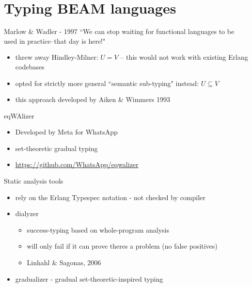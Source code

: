 \documentclass[
  ignorenonframetext,
  aspectratio=169]{beamer}
\providecommand{\tightlist}{%
  \setlength{\itemsep}{0pt}\setlength{\parskip}{0pt}}
\begin{document}
\section{Typing BEAM languages}\label{typing-beam-languages}

\begin{frame}{Marlow \& Wadler - 1997}
\label{marlow-wadler---1997}
\centering
``We can stop waiting for functional languages to be used in practice--that day is here!"

\begin{itemize}
\tightlist
\item
  threw away Hindley-Milner: \(U = V\) -- this would not work with
  existing Erlang codebases
\item
  opted for strictly more general ``semantic sub-typing" instead:
  \(U \subseteq V\)
\item
  this approach developed by Aiken \& Wimmers 1993
\end{itemize}
\end{frame}

\begin{frame}{eqWAlizer}
\label{eqwalizer}
\begin{itemize}
\tightlist
\item
  Developed by Meta for WhatsApp
\item
  set-theoretic gradual typing
\item
  \url{https://github.com/WhatsApp/eqwalizer}
\end{itemize}
\end{frame}

\begin{frame}{Static analysis tools}
\label{static-analysis-tools}
\begin{itemize}
\tightlist
\item
  rely on the Erlang Typespec notation - not checked by compiler
\item
  dialyzer

  \begin{itemize}
  \tightlist
  \item
    success-typing based on whole-program analysis
  \item
    will only fail if it can prove there\textquotesingle s a problem (no
    false positives)
  \item
    Linhahl \& Sagonas, 2006
  \end{itemize}
\item
  gradualizer - gradual set-theoretic-inspired typing
\end{itemize}
\end{frame}
\end{document}
